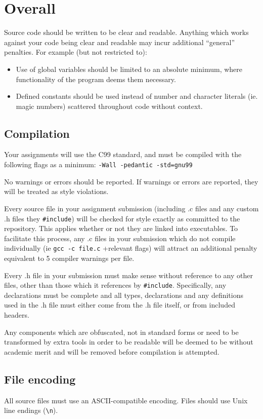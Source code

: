 \documentclass{article}
\begin{document}
\section{Overall}
Source code should be written to be clear and readable.
Anything which works against your code being clear and readable may incur additional ``general'' penalties.
For example (but not restricted to):
\begin{itemize}
\item Use of global variables should be limited to an absolute minimum, where functionality of the program deems them necessary.
\item Defined constants should be used instead of number and character literals (ie. magic numbers) scattered throughout code without context.
\end{itemize}

\subsection{Compilation}
Your assignments will use the C99 standard, and must be compiled with the following flags as a minimum: \texttt{-Wall -pedantic -std=gnu99}

No warnings or errors should be reported.
If warnings or errors are reported, they will be treated as style violations.

Every source file in your assignment submission (including .c files and any custom .h files they \texttt{\#include}) will be checked for style exactly as committed to the repository.
This applies whether or not they are linked into executables.
To facilitate this process, any .c files in your submission which do not compile individually (ie \texttt{gcc -c file.c} +relevant flags) will attract an additional penalty equivalent to 5 compiler warnings per file.

Every .h file in your submission must make sense without reference to any other files, other than those which it references by \texttt{\#include}.
Specifically, any declarations must be complete and all types, declarations and any definitions used in the .h file must either come from the .h file itself, or from included headers.

Any components which are obfuscated, not in standard forms or need to be transformed by extra tools in order to be readable will be deemed to be without academic merit and will be removed before compilation is attempted.

\subsection{File encoding}
All source files must use an ASCII-compatible encoding. 
Files should use Unix line endings (\texttt{\textbackslash n}).
\end{document}
